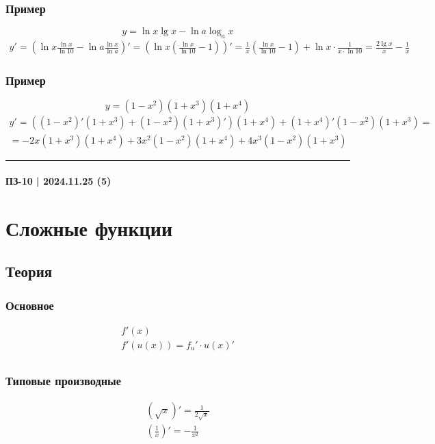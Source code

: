 \documentclass{article}
\begin{document}
\subsubsection{Пример}
\[
    y = \ln x \lg x - \ln a \log_{a} x
\]
\begin{gather*}
    y' = \left( \ln x \frac{\ln x}{\ln 10} - \ln a \frac{\ln x}{\ln a} \right)' =
    \left( \ln x \left( \frac{\ln x}{\ln 10} - 1 \right) \right)' =
    \frac{1}{x} \left( \frac{\ln x}{\ln 10} - 1 \right) + \ln x \cdot \frac{1}{x \cdot \ln 10} =
    \frac{2 \lg x}{x} - \frac{1}{x}
\end{gather*}

\subsubsection{Пример}
\[
    y = (1 - x^2)(1 + x^3)(1 + x^4)
\]
\begin{gather*}
    y' = \left((1 - x^2)'(1 + x^3) + (1 - x^2)(1 + x^3)' \right)(1 + x^4) + (1 + x^4)'(1 - x^2)(1 + x^3) = \\
    = -2x (1 + x^3)(1 + x^4) + 3x^2 (1 - x^2)(1 + x^4) + 4x^3 (1 - x^2)(1 + x^3) 
\end{gather*}



\par\noindent\rule{\textwidth}{1pt}
\paragraph{ПЗ-10 | 2024.11.25 (5)}
\section{Сложные функции}

\subsection{Теория}

\subsubsection{Основное}
\begin{gather*}
    f'(x) \\
    f'(u(x)) = f_u' \cdot u(x)' \\ 
\end{gather*}

\subsubsection{Типовые производные}
\begin{gather*}
    (\sqrt{x})' = \frac{1}{2\sqrt{x}} \\
    \left( \frac{1}{x} \right)' = -\frac{1}{x^2}
\end{gather*}
\end{document}
